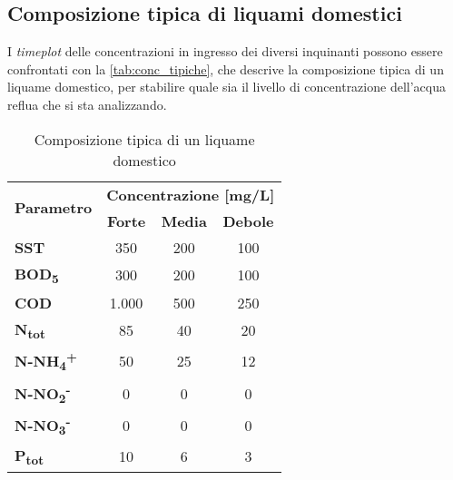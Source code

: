 \subsection{Composizione tipica di liquami domestici}
I \textit{timeplot} delle concentrazioni in ingresso dei diversi inquinanti possono essere confrontati con la \autoref{tab:conc_tipiche}, che descrive la composizione tipica di un liquame domestico, per stabilire quale sia il livello di concentrazione dell'acqua reflua che si sta analizzando. 

\begin{table}
	\scriptsize
	\begin{center}
		\begin{tabular}{|l|c|c|c|}
			\hline
			\multicolumn{1}{|c|}{\multirow{2}{*}{\textbf{Parametro}}} & \multicolumn{3}{c|}{\textbf{Concentrazione {[}mg/L{]}}} \\ \cline{2-4} 
			\multicolumn{1}{|c|}{}                                    & \textbf{Forte}   & \textbf{Media}   & \textbf{Debole}   \\ \hline
			\textbf{SST}                                              & 350              & 200              & 100               \\ \hline
			\textbf{BOD\textsubscript{5}}                                             & 300              & 200              & 100               \\ \hline
			\textbf{COD}                                              & 1.000            & 500              & 250               \\ \hline
			\textbf{N\textsubscript{tot}}                                             & 85               & 40               & 20                \\ \hline
			\textbf{N-NH\textsubscript{4}\textsuperscript{+}}                                           & 50               & 25               & 12                \\ \hline
			\textbf{N-NO\textsubscript{2}\textsuperscript{-}}                                            & 0                & 0                & 0                 \\ \hline
			\textbf{N-NO\textsubscript{3}\textsuperscript{-}}                                            & 0                & 0                & 0                 \\ \hline
			\textbf{P\textsubscript{tot}}                                             & 10               & 6                & 3                 \\ \hline
		\end{tabular}
		\caption{Composizione tipica di un liquame domestico \cite{vismara}}
		\label{tab:conc_tipiche}
	\end{center}
\end{table}

